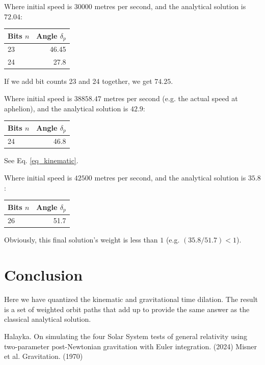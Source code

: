 \documentclass[12pt]{article}
\begin{document}
Where initial speed is $30000$ metres per second, and the analytical solution is $72.04$:
\begin{center}
\begin{tabular}{| l | r |}
  \hline
Bits $n$ & Angle $\delta_{p}$\\
\hline
\hline
23 & 46.45 \\
24 & 27.8 \\
  \hline  
\end{tabular}
\end{center}
If we add bit counts 23 and 24 together, we get $74.25$.

Where initial speed is $38858.47$ metres per second (e.g. the actual speed at aphelion), and the analytical solution is $42.9$:
\begin{center}
\begin{tabular}{| l | r |}
  \hline
Bits $n$ & Angle $\delta_{p}$ \\
\hline
\hline
24 & 46.8 \\
  \hline  
\end{tabular}
\end{center}
See Eq. \ref{eq_kinematic}.

Where initial speed is $42500$ metres per second, and the analytical solution is $35.8$:
\begin{center}
\begin{tabular}{| l | r |}
  \hline
Bits $n$ & Angle $\delta_{p}$\\
\hline
\hline
26 & 51.7 \\
  \hline  
\end{tabular}
\end{center}
Obviously, this final solution's weight is less than $1$ (e.g. $(35.8 / 51.7) < 1$).




\section{Conclusion}

Here we have quantized the kinematic and gravitational time dilation.
The result is a set of weighted orbit paths that add up to provide the same answer as the classical analytical solution.





\begin{thebibliography}{9}


 Halayka. On simulating the four Solar System tests of general relativity using two-parameter post-Newtonian gravitation with Euler integration. (2024)
 Misner et al. Gravitation. (1970)

\end{thebibliography}
\end{document}
